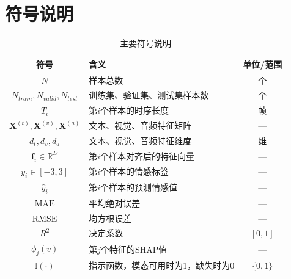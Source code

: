 \section{符号说明}


\begin{table}[htbp]
\centering
\caption{主要符号说明}
\begin{tabular}{c|l|c}
\toprule
\textbf{符号} & \textbf{含义} & \textbf{单位/范围} \\
\midrule
$N$ & 样本总数 & 个 \\
$N_{train}, N_{valid}, N_{test}$ & 训练集、验证集、测试集样本数 & 个 \\
$T_i$ & 第$i$个样本的时序长度 & 帧 \\
$\mathbf{X}^{(t)}, \mathbf{X}^{(v)}, \mathbf{X}^{(a)}$ & 文本、视觉、音频特征矩阵 & --- \\
$d_t, d_v, d_a$ & 文本、视觉、音频特征维度 & 维 \\
$\mathbf{f}_i \in \mathbb{R}^D$ & 第$i$个样本对齐后的特征向量 & --- \\
$y_i \in [-3, 3]$ & 第$i$个样本的情感标签 & --- \\
$\hat{y}_i$ & 第$i$个样本的预测情感值 & --- \\
$\text{MAE}$ & 平均绝对误差 & --- \\
$\text{RMSE}$ & 均方根误差 & --- \\
$R^2$ & 决定系数 & $[0, 1]$ \\
$\phi_j(v)$ & 第$j$个特征的SHAP值 & --- \\
$\mathbb{I}(\cdot)$ & 指示函数，模态可用时为1，缺失时为0 & $\{0,1\}$ \\
\bottomrule
\end{tabular}
\end{table}

